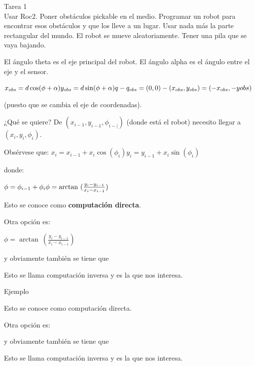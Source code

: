 \begin{scaja}
Tarea 1 \\
Usar Roc2. Poner obstáculos pickable en el medio. Programar un robot para encontrar esos obstáculos y que
los lleve a un lugar. Usar nada más la parte rectangular del mundo. El robot se mueve aleatoriamente. Tener
una pila que se vaya bajando.
\end{scaja}

El ángulo theta es el eje principal del robot. El ángulo alpha es el ángulo entre el eje y el sensor.


$
x_{obs}=d\cos(\phi+\alpha) \\ y_{obs}=d\sin(\phi+\alpha) \\ \\
q-q_{obs}=(0,0)-(x_{obs},y_{obs})=(-x_{obs},-y{obs})
$

(puesto que se cambia el eje de coordenadas).

¿Qué se quiere?
De $(x_{i-1},y_{i-1},\phi_{i-|})$ (donde está el robot) necesito llegar a $(x_i,y_i,\phi_i)$.

Obsérvese que: 
 $x_i=x_{i-1}+x_i \cos(\phi_i)
 y_i=y_{i-1}+x_i \sin(\phi_i)
 $
 
donde:

$
\phi=\phi_{i-1}+\phi_i \\
\phi=\arctan\ (\frac{y_i -y_{i-1}}{x_i -x_{i-1}})
$


Esto se conoce como \textbf{computación directa}.

Otra opción es:

$
\phi=\arctan\ (\frac{y_i -y_{i-1}}{x_i -x_{i-1}})
$


y obviamente también se tiene que 

Esto se llama computación inversa y es la que nos interesa.




Ejemplo


Esto se conoce como computación directa.

Otra opción es:



y obviamente también se tiene que 

Esto se llama computación inversa y es la que nos interesa.


